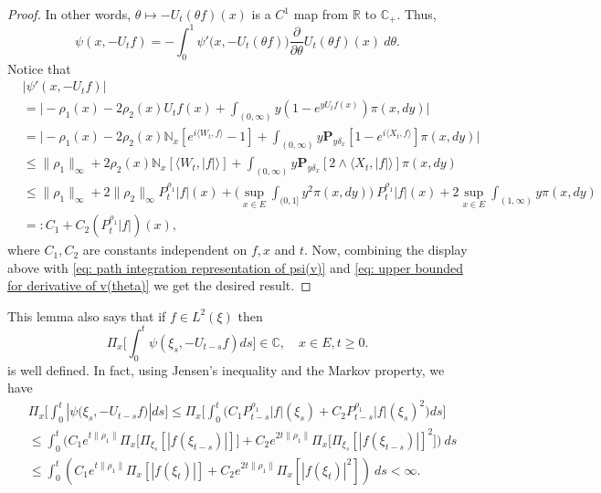 \documentclass[12pt,a4paper]{amsart}
\theoremstyle{plain}
\theoremstyle{definition}
\numberwithin{equation}{section}
\begin{document}
\begin{proof}
  In other words, $\theta \mapsto -U_t(\theta f)(x)$ is a $C^1$ map from $\mathbb R$ to $\mathbb C_+$.
  Thus,
  \begin{equation}
    \label{eq: path integration representation of psi(v)}
    \psi(x,-U_tf)
    = -\int_0^1 \psi'\big(x,-U_t(\theta f)\big) \frac{\partial}{\partial \theta} U_t(\theta f)(x)~d\theta.
  \end{equation}
  Notice that
  \begin{align}
    & |\psi'(x, -U_tf)| \\
    & = \Big| -\rho_1(x)- 2\rho_2(x) U_tf(x)+ \int_{(0,\infty)} y (1- e^{y U_tf(x)} ) \pi(x,dy)\Big| \\
    & = \Big| - \rho_1(x)- 2\rho_2(x)\mathbb N_x[e^{i \langle W_t, f\rangle} - 1]  + \int_{(0,\infty)} y \mathbf P_{y \delta_x}[1-e^{i \langle X_t, f\rangle}] \pi(x,dy) \Big| \\
    & \leq \|\rho_1\|_\infty + 2\rho_2(x)\mathbb N_x[\langle W_t, |f|\rangle]+ \int_{(0,\infty)} y\mathbf P_{y\delta_x}[2\wedge \langle X_t, |f|\rangle] \pi(x,dy) \\
    & \leq \|\rho_1\|_\infty + 2\|\rho_2\|_\infty P^{\rho_1}_t |f|(x) + \Big(\sup_{x\in E}\int_{(0,1]}y^2 \pi(x,dy)\Big)~P^{\rho_1}_t |f|(x) + 2\sup_{x\in E}\int_{(1,\infty)} y \pi(x,dy) \\
    & =: C_1 + C_2(P^{\rho_1}_t |f|)(x), \label{eq: upper bound of psi'(v)}
  \end{align}
  where $C_1, C_2$ are constants independent on $f,x$ and $t$.
  Now, combining the display above with \eqref{eq: path integration representation of psi(v)} and \eqref{eq: upper bounded for derivative of v(theta)}
  we get the desired result.
\end{proof}
This lemma also says that if $f\in L^2(\xi)$ then
\[
  \Pi_x\Big[\int_0^t \psi(\xi_s,- U_{t-s}f)ds\Big]
  \in \mathbb C,
  \quad x\in E, t\geq 0.
\]
is well defined.
In fact, using Jensen's inequality and the Markov property, we have
\begin{align}
  \label{eq: domination of psi(v)}
  & \Pi_x\Big[\int_0^t |\psi \big(\xi_s,-U_{t-s}f\big)|ds\Big]
  \leq \Pi_x\Big[\int_0^t \big(C_1 P_{t-s}^{\rho_1}|f|(\xi_s)+C_2 P_{t-s}^{\rho_1}|f|(\xi_s)^2\big)ds\Big] \\
  & \leq \int_0^t \big(C_1 e^{t\|\rho_1\|}\Pi_x \big[ \Pi_{\xi_s}[|f(\xi_{t-s})|] \big]+C_2 e^{2t\|\rho_1\|}\Pi_x \big[ \Pi_{\xi_s}[|f (\xi_{t-s})|]^2 \big]\big)~ds \\
  & \leq \int_0^t (C_1 e^{t\|\rho_1\|}\Pi_x [ |f(\xi_{t})|]+C_2e^{2t\|\rho_1\|}\Pi_x [ |f (\xi_{t})|^2 ])~ds < \infty.
\end{align}
\end{document}
